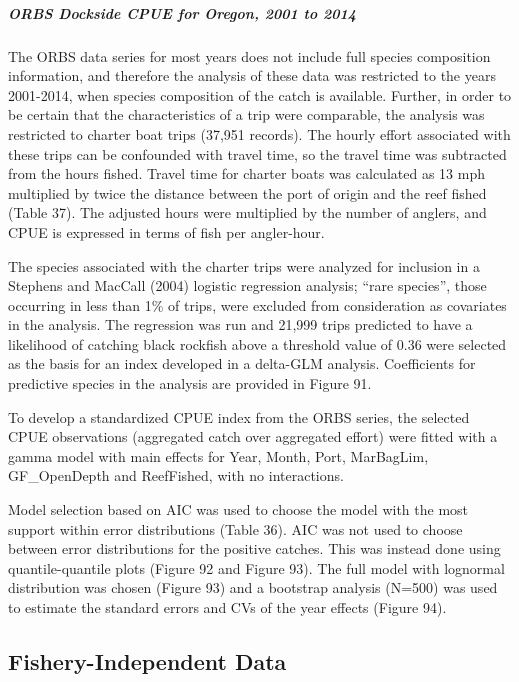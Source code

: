 \documentclass[11pt,
  english,
  letterpaper,
]{article}
\begin{document}
\hypertarget{orbs-dockside-cpue-for-oregon-2001-to-2014}{%
\subparagraph{ORBS Dockside CPUE for Oregon, 2001 to 2014}\label{orbs-dockside-cpue-for-oregon-2001-to-2014}}

The ORBS data series for most years does not include full species composition information, and therefore the analysis of these data was restricted to the years 2001-2014, when species composition of the catch is available. Further, in order to be certain that the characteristics of a trip were comparable, the analysis was restricted to charter boat trips (37,951 records). The hourly effort associated with these trips can be confounded with travel time, so the travel time was subtracted from the hours fished. Travel time for charter boats was calculated as 13 mph multiplied by twice the distance between the port of origin and the reef fished (Table 37). The adjusted hours were multiplied by the number of anglers, and CPUE is expressed in terms of fish per angler-hour.

The species associated with the charter trips were analyzed for inclusion in a Stephens and MacCall (2004) logistic regression analysis; ``rare species'', those occurring in less than 1\% of trips, were excluded from consideration as covariates in the analysis. The regression was run and 21,999 trips predicted to have a likelihood of catching black rockfish above a threshold value of 0.36 were selected as the basis for an index developed in a delta-GLM analysis. Coefficients for predictive species in the analysis are provided in Figure 91.

To develop a standardized CPUE index from the ORBS series, the selected CPUE observations (aggregated catch over aggregated effort) were fitted with a gamma model with main effects for Year, Month, Port, MarBagLim, GF\_OpenDepth and ReefFished, with no interactions.

Model selection based on AIC was used to choose the model with the most support within error distributions (Table 36). AIC was not used to choose between error distributions for the positive catches. This was instead done using quantile-quantile plots (Figure 92 and Figure 93). The full model with lognormal distribution was chosen (Figure 93) and a bootstrap analysis (N=500) was used to estimate the standard errors and CVs of the year effects (Figure 94).

\hypertarget{fishery-independent-data}{%
\subsection{Fishery-Independent Data}\label{fishery-independent-data}}
\end{document}
